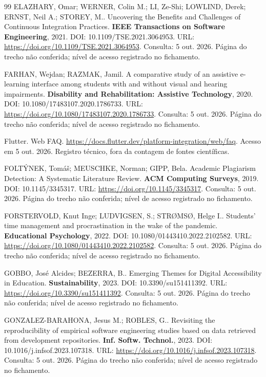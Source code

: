 \begin{thebibliography}{99}
 ELAZHARY, Omar; WERNER, Colin M.; LI, Ze-Shi; LOWLIND, Derek; ERNST, Neil A.; STOREY, M.. Uncovering the Benefits and Challenges of Continuous Integration Practices. \textbf{IEEE Transactions on Software Engineering}, 2021. DOI: 10.1109/TSE.2021.3064953. URL: \url{https://doi.org/10.1109/TSE.2021.3064953}. Consulta: 5 out. 2026. Página do trecho não conferida; nível de acesso registrado no fichamento.

 FARHAN, Wejdan; RAZMAK, Jamil. A comparative study of an assistive e-learning interface among students with and without visual and hearing impairments. \textbf{Disability and Rehabilitation: Assistive Technology}, 2020. DOI: 10.1080/17483107.2020.1786733. URL: \url{https://doi.org/10.1080/17483107.2020.1786733}. Consulta: 5 out. 2026. Página do trecho não conferida; nível de acesso registrado no fichamento.

 Flutter. Web FAQ. \url{https://docs.flutter.dev/platform-integration/web/faq}. Acesso em 5 out. 2026. Registro técnico, fora da contagem de fontes científicas.

 FOLTÝNEK, Tomáš; MEUSCHKE, Norman; GIPP, Bela. Academic Plagiarism Detection: A Systematic Literature Review. \textbf{ACM Computing Surveys}, 2019. DOI: 10.1145/3345317. URL: \url{https://doi.org/10.1145/3345317}. Consulta: 5 out. 2026. Página do trecho não conferida; nível de acesso registrado no fichamento.

 FORSTERVOLD, Knut Inge; LUDVIGSEN, S.; STRØMSØ, Helge I.. Students’ time management and procrastination in the wake of the pandemic. \textbf{Educational Psychology}, 2022. DOI: 10.1080/01443410.2022.2102582. URL: \url{https://doi.org/10.1080/01443410.2022.2102582}. Consulta: 5 out. 2026. Página do trecho não conferida; nível de acesso registrado no fichamento.

 GOBBO, José Alcides; BEZERRA, B.. Emerging Themes for Digital Accessibility in Education. \textbf{Sustainability}, 2023. DOI: 10.3390/su151411392. URL: \url{https://doi.org/10.3390/su151411392}. Consulta: 5 out. 2026. Página do trecho não conferida; nível de acesso registrado no fichamento.

 GONZALEZ-BARAHONA, Jesus M.; ROBLES, G.. Revisiting the reproducibility of empirical software engineering studies based on data retrieved from development repositories. \textbf{Inf. Softw. Technol.}, 2023. DOI: 10.1016/j.infsof.2023.107318. URL: \url{https://doi.org/10.1016/j.infsof.2023.107318}. Consulta: 5 out. 2026. Página do trecho não conferida; nível de acesso registrado no fichamento.


\end{thebibliography}
